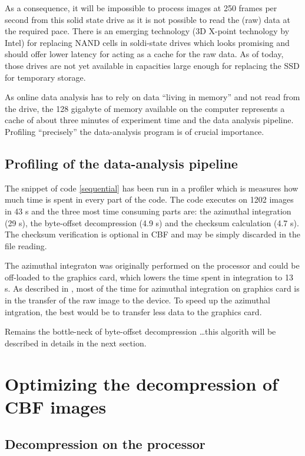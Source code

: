 \documentclass[preprint, pdf]{iucr}              %
\begin{document}
As a consequence, it will be impossible to process images at 250 frames per
second from this solid state drive as it is not possible to read the (raw) data
at the required pace.
There is an emerging technology (3D X-point technology by Intel) for replacing
NAND cells in soldi-state drives which looks promising and should offer
lower latency for acting as a cache for the raw data. 
As of today, those drives are not yet available in capacities large
enough for replacing the SSD for temporary storage.

As online data analysis has to rely on data ``living in memory'' and not
read from the drive, the 128 gigabyte of memory available on the computer
represents a cache of about three minutes of experiment time and the data
analysis pipeline. 
Profiling ``precisely'' the data-analysis program is of crucial importance. 

\subsection{Profiling of the data-analysis pipeline}

The snippet of code \ref{sequential} has been run in a profiler which is
measures how much time is spent in every part of the code. 
The code executes on 1202 images in 43 s and the three most time consuming parts
are: the azimuthal integration (29 s), the byte-offset decompression (4.9 s) and
the checksum calculation (4.7 s).
The checksum verification is optional in CBF and may be simply discarded in the
file reading.

The azimuthal integraton was originally performed on the processor and could be
off-loaded to the graphics card, which lowers the time spent in integration to 
13 s.
As described in \cite{kieffer_ashiotis-proc-euroscipy-2014}, most of the time
for azimuthal integration on graphics card is in the transfer of the raw image
to the device.
To speed up the azimuthal intgration, the best would be to transfer less data to
the graphics card.

Remains the bottle-neck of byte-offset decompression \ldots this algorith will
be described in details in the next section. 

\section{Optimizing the decompression of CBF images}

\subsection{Decompression on the processor}
\end{document}
